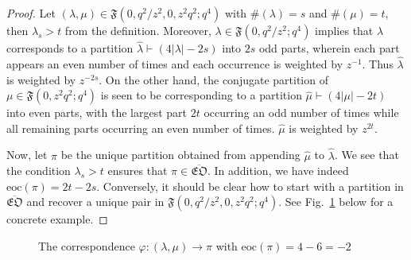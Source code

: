 \documentclass[12pt,reqno]{amsart}
\numberwithin{equation}{section}
\theoremstyle{plain}
\theoremstyle{definition}
\def\fF{\mathfrak{F}}
\def\bfEO{\overline{\mathfrak{EO}}}
\def\eoc{\mathrm{eoc}}
\begin{document}
\begin{proof}
Let $(\lambda,\mu)\in\fF(0,q^2/z^2,0,z^2q^2;q^4)$ with $\#(\lambda)=s$ and $\#(\mu)=t$, then $\lambda_s>t$
from the definition. Moreover, $\lambda\in\fF(0,q^2/z^2;q^4)$ implies that $\lambda$ corresponds to a
partition $\hat{\lambda}\vdash (4|\lambda|-2s)$ into $2s$ odd parts, wherein each part appears an even number
of times and each occurrence is weighted by $z^{-1}$. Thus $\hat{\lambda}$ is weighted by $z^{-2s}$. On the
other hand, the conjugate partition of $\mu\in\fF(0,z^2q^2;q^4)$ is seen to be corresponding to a partition
$\hat{\mu}\vdash (4|\mu|-2t)$ into even parts, with the largest part $2t$ occurring an odd number of times
while all remaining parts occurring an even number of times. $\hat{\mu}$ is weighted by $z^{2t}$.

Now, let $\pi$ be the unique partition obtained from appending $\hat{\mu}$ to $\hat{\lambda}$. We see that
the condition $\lambda_s>t$ ensures that $\pi\in\bfEO$. In addition, we have indeed $\eoc(\pi)=2t-2s$.
Conversely, it should be clear how to start with a partition in $\bfEO$ and recover a unique pair in
$\fF(0,q^2/z^2,0,z^2q^2;q^4)$. See Fig.~\ref{varphi} below for a concrete example.
\end{proof}

\begin{figure}[t!]
\begin{ferrers}[1.45]
\end{ferrers}
\begin{ferrers}[0.7]
\putright
{}
\putright
{}
\end{ferrers}
\caption{The correspondence $\varphi: (\lambda,\mu)\to \pi$ with $\eoc(\pi)=4-6=-2$}
\label{varphi}
\end{figure}
\end{document}
